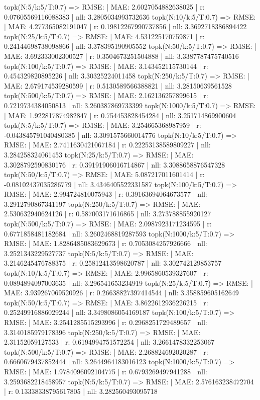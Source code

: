 topk(N:5/k:5/T:0.7) => RMSE: | MAE: 2.6027054882638025 | r: 0.07605569116088383 | nll: 3.2805034993732636
topk(N:10/k:5/T:0.7) => RMSE: | MAE: 4.277365082191047 | r: 0.19812267990737856 | nll: 3.3692718386894422
topk(N:25/k:5/T:0.7) => RMSE: | MAE: 4.531225170759871 | r: 0.24144698738098866 | nll: 3.378395190905552
topk(N:50/k:5/T:0.7) => RMSE: | MAE: 3.692333002300527 | r: 0.3504673251504888 | nll: 3.3387787475740516
topk(N:100/k:5/T:0.7) => RMSE: | MAE: 3.143452115730144 | r: 0.454329820895226 | nll: 3.30325224011458
topk(N:250/k:5/T:0.7) => RMSE: | MAE: 2.679174539280599 | r: 0.5130589566388821 | nll: 3.28150639561528
topk(N:500/k:5/T:0.7) => RMSE: | MAE: 2.162136257899615 | r: 0.7219734384050813 | nll: 3.260387869733399
topk(N:1000/k:5/T:0.7) => RMSE: | MAE: 1.922817874982847 | r: 0.754453828454284 | nll: 3.251714869900604
topk(N:5/k:5/T:0.7) => RMSE: | MAE: 3.254665368987959 | r: -0.043845791040480385 | nll: 3.3091575660014776
topk(N:10/k:5/T:0.7) => RMSE: | MAE: 2.7411630421067184 | r: 0.22253138589809227 | nll: 3.284258324061453
topk(N:25/k:5/T:0.7) => RMSE: | MAE: 3.3028792590830176 | r: 0.39191906016714867 | nll: 3.3088658876547328
topk(N:50/k:5/T:0.7) => RMSE: | MAE: 5.087217011601414 | r: -0.08102437035286779 | nll: 3.4346405522331587
topk(N:100/k:5/T:0.7) => RMSE: | MAE: 2.994724810075943 | r: 0.39163694064673577 | nll: 3.2912790867341197
topk(N:250/k:5/T:0.7) => RMSE: | MAE: 2.530632940624126 | r: 0.587003171616865 | nll: 3.273788855920127
topk(N:500/k:5/T:0.7) => RMSE: | MAE: 2.0987923171234595 | r: 0.6771858481182684 | nll: 3.2602468819287593
topk(N:1000/k:5/T:0.7) => RMSE: | MAE: 1.8286485083629673 | r: 0.7053084257926666 | nll: 3.2521343229527737
topk(N:5/k:5/T:0.7) => RMSE: | MAE: 3.2146245476788375 | r: 0.25812413598620787 | nll: 3.302742129853757
topk(N:10/k:5/T:0.7) => RMSE: | MAE: 2.9965860539327607 | r: 0.0894894097003635 | nll: 3.296541653234919
topk(N:25/k:5/T:0.7) => RMSE: | MAE: 3.939267069520926 | r: 0.26638827397414544 | nll: 3.358859605162649
topk(N:50/k:5/T:0.7) => RMSE: | MAE: 3.8622612936226215 | r: 0.25249916886029244 | nll: 3.3498086054169187
topk(N:100/k:5/T:0.7) => RMSE: | MAE: 3.2541285515293996 | r: 0.2968251729489657 | nll: 3.3140185979178396
topk(N:250/k:5/T:0.7) => RMSE: | MAE: 2.31152059127533 | r: 0.6194994751572254 | nll: 3.2661478332253067
topk(N:500/k:5/T:0.7) => RMSE: | MAE: 2.268824692020287 | r: 0.6660679437852444 | nll: 3.2644964183016123
topk(N:1000/k:5/T:0.7) => RMSE: | MAE: 1.9784096092104775 | r: 0.6793269497941288 | nll: 3.2593682218458957
topk(N:5/k:5/T:0.7) => RMSE: | MAE: 2.576163238472704 | r: 0.13338338795617805 | nll: 3.282560493095718
